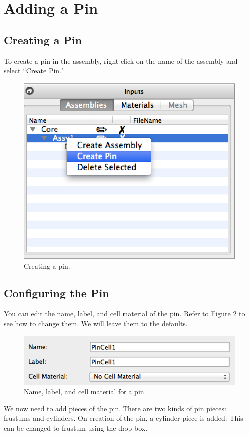 \section{Adding a Pin}
\subsection{Creating a Pin}

To create a pin in the assembly, right click on the name of the assembly and select ``Create Pin."

\begin{figure}[H]
	\begin{center}
		\includegraphics[width=0.5\linewidth]{Images/hex-create-pin.png}
		\caption{Creating a pin.}
		\label{fig:Hex9}
	\end{center}
\end{figure}

\subsection{Configuring the Pin}

You can edit the name, label, and cell material of the pin.  Refer to Figure \ref{fig:Hex10} to see how to change them.  We will leave them to the defaults.

\begin{figure}[H]
	\begin{center}
		\includegraphics[width=0.5\linewidth]{Images/hex-default-pin-params.png}
		\caption{Name, label, and cell material for a pin.}
		\label{fig:Hex10}
	\end{center}
\end{figure}

We now need to add pieces of the pin.  There are two kinds of pin pieces: frustums and cylinders.  On creation of the pin, a cylinder piece is added.  This can be changed to frustum using the drop-box.

